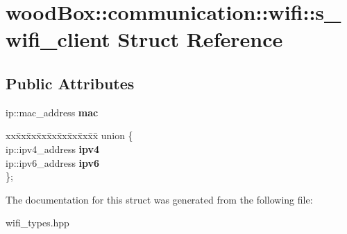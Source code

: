 \hypertarget{structwood_box_1_1communication_1_1wifi_1_1s__wifi__client}{}\section{wood\+Box\+:\+:communication\+:\+:wifi\+:\+:s\+\_\+wifi\+\_\+client Struct Reference}
\label{structwood_box_1_1communication_1_1wifi_1_1s__wifi__client}
\subsection*{Public Attributes}
\begin{DoxyCompactItemize}
\item 
\mbox{\label{structwood_box_1_1communication_1_1wifi_1_1s__wifi__client_a0c2a084f86b4588303015c0301bc8825}} 
ip\+::mac\+\_\+address {\bfseries mac}
\item 
\mbox{\label{structwood_box_1_1communication_1_1wifi_1_1s__wifi__client_aff8409791f4f0dd0b222adab2e73d151}} 
\begin{tabbing}
xx\=xx\=xx\=xx\=xx\=xx\=xx\=xx\=xx\=\kill
union \{\\
\>ip::ipv4\_address {\bfseries ipv4}\\
\>ip::ipv6\_address {\bfseries ipv6}\\
\}; \\

\end{tabbing}\end{DoxyCompactItemize}


The documentation for this struct was generated from the following file\+:\begin{DoxyCompactItemize}
\item 
wifi\+\_\+types.\+hpp\end{DoxyCompactItemize}

